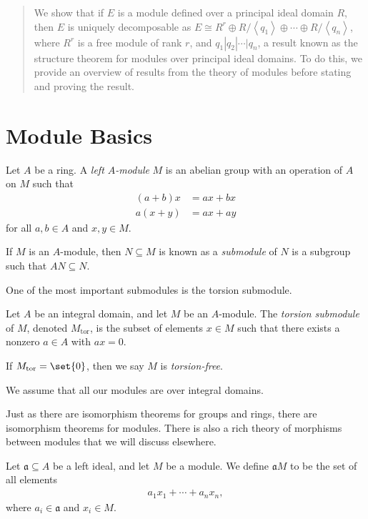 \documentclass[10pt]{mypackage}
\DeclareMathOperator{\tor}{tor}
\begin{document}
\RaggedRight
\begin{abstract}
  \noindent We show that if $E$ is a module defined over a principal ideal domain $R$, then $E$ is uniquely decomposable as $E \cong R^{r}\oplus R/\left\langle q_1 \right\rangle\oplus \cdots \oplus R/\left\langle q_n \right\rangle$, where $R^{r}$ is a free module of rank $r$, and $q_1 | q_2 | \cdots | q_n$, a result known as the structure theorem for modules over principal ideal domains. To do this, we provide an overview of results from the theory of modules before stating and proving the result.
\end{abstract}
\section{Module Basics}%
\begin{definition}
  Let $A$ be a ring. A \textit{left $A$-module} $M$ is an abelian group with an operation of $A$ on $M$ such that
  \begin{align*}
    \left( a + b \right)x &= ax + bx\\
    a\left( x + y \right) &= ax + ay
  \end{align*}
  for all $a,b\in A$ and $x,y\in M$.\newline

  If $M$ is an $A$-module, then $N\subseteq M$ is known as a \textit{submodule} of $N$ is a subgroup such that $AN \subseteq N$.
\end{definition}
One of the most important submodules is the torsion submodule.
\begin{definition}
  Let $A$ be an integral domain, and let $M$ be an $A$-module. The \textit{torsion submodule} of $M$, denoted $M_{\tor}$, is the subset of elements $x\in M$ such that there exists a nonzero $a\in A$ with $ax = 0$.\newline

  If $M_{\tor} = \set{0}$, then we say $M$ is \textit{torsion-free}.
\end{definition}
We assume that all our modules are over integral domains.\newline

Just as there are isomorphism theorems for groups and rings, there are isomorphism theorems for modules. There is also a rich theory of morphisms between modules that we will discuss elsewhere.
\begin{definition}
  Let $\mathfrak{a}\subseteq A$ be a left ideal, and let $M$ be a module. We define $\mathfrak{a}M$ to be the set of all elements
  \begin{align*}
    a_1x_1 + \cdots + a_nx_n,
  \end{align*}
  where $a_i\in \mathfrak{a}$ and $x_i\in M$.
\end{definition}
\end{document}
